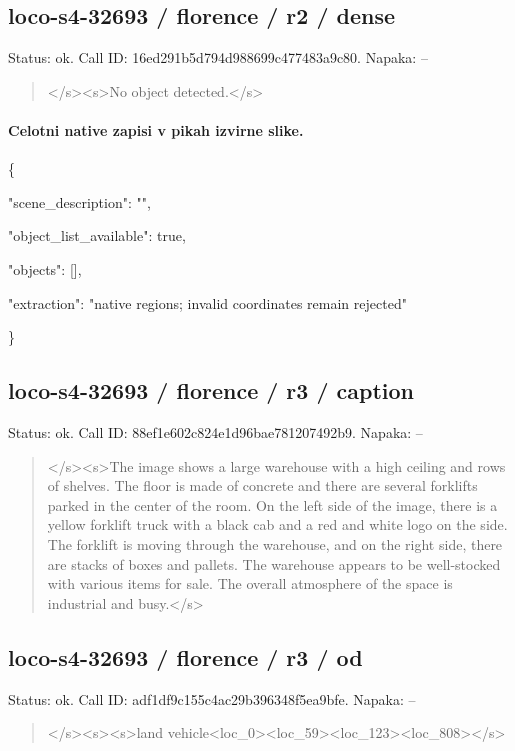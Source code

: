 \documentclass[10pt,a4paper]{article}
\begin{document}
\subsection*{loco-s4-32693 / florence / r2 / dense}
Status: ok. Call ID: 16ed291b5d794d988699c477483a9c80. Napaka: --
\begin{quote}\footnotesize
</s>\allowbreak{}<s>\allowbreak{}No object detected.</s>\allowbreak{}
\end{quote}
\paragraph{Celotni native zapisi v pikah izvirne slike.}
\{\par
  "scene\_description":\allowbreak{} "",\allowbreak{}\par
  "object\_list\_available":\allowbreak{} true,\allowbreak{}\par
  "objects":\allowbreak{} [],\allowbreak{}\par
  "extraction":\allowbreak{} "native regions; invalid coordinates remain rejected"\par
\}
\subsection*{loco-s4-32693 / florence / r3 / caption}
Status: ok. Call ID: 88ef1e602c824e1d96bae781207492b9. Napaka: --
\begin{quote}\footnotesize
</s>\allowbreak{}<s>\allowbreak{}The image shows a large warehouse with a high ceiling and rows of shelves. The floor is made of concrete and there are several forklifts parked in the center of the room. On the left side of the image,\allowbreak{} there is a yellow forklift truck with a black cab and a red and white logo on the side. The forklift is moving through the warehouse,\allowbreak{} and on the right side,\allowbreak{} there are stacks of boxes and pallets. The warehouse appears to be well-stocked with various items for sale. The overall atmosphere of the space is industrial and busy.</s>\allowbreak{}
\end{quote}
\subsection*{loco-s4-32693 / florence / r3 / od}
Status: ok. Call ID: adf1df9c155c4ac29b396348f5ea9bfe. Napaka: --
\begin{quote}\footnotesize
</s>\allowbreak{}<s>\allowbreak{}<s>\allowbreak{}land vehicle<loc\_0>\allowbreak{}<loc\_59>\allowbreak{}<loc\_123>\allowbreak{}<\allowbreak{}loc\_808>\allowbreak{}</s>\allowbreak{}
\end{quote}
\end{document}
